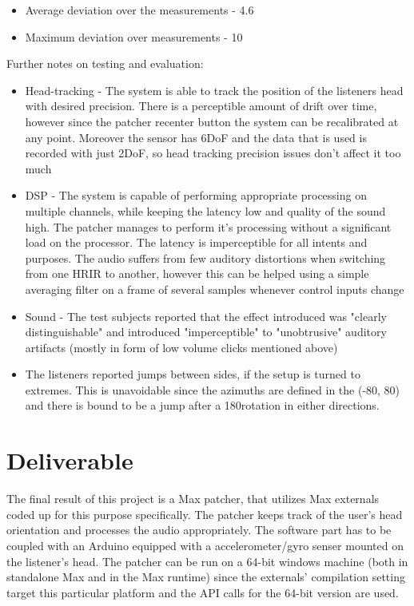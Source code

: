 \documentclass[a4paper,12pt,oneside]{article}
\begin{document}
\begin{itemize}
\begin {center}
\begin {itemize}

\item Average deviation over the  measurements - 4.6\degree 
\item Maximum deviation over measurements - 10\degree 
\end{itemize}
\end {center}

\end{itemize}

Further notes on testing and evaluation:
\begin{itemize}
\item Head-tracking - The system is able to track the position of the listeners head with desired precision. There is a perceptible amount of drift over time, however since the patcher recenter button the system can be recalibrated at any point. Moreover the sensor has 6DoF and the data that is used is recorded with just 2DoF, so head tracking precision issues don't affect it too much
\item DSP - The system is capable of performing appropriate processing on multiple channels, while keeping the latency low and quality of the sound high. The patcher manages to perform it's processing without a significant load on the processor. The latency is imperceptible for all intents and purposes. The audio suffers from few auditory distortions when switching from one HRIR to another, however this can be helped using a simple averaging filter on a frame of several samples whenever control inputs change
\item Sound - The test subjects reported that the effect introduced was "clearly distinguishable" and introduced "imperceptible" to "unobtrusive" auditory artifacts (mostly in form of low volume clicks mentioned above)
\item The listeners reported jumps between sides, if the setup is turned to extremes. This is unavoidable since the azimuths are defined in the (-80, 80) and there is bound to be a jump after a 180\degree rotation in either directions.
\end{itemize}

\section{Deliverable}

The final result of this project is a Max patcher, that utilizes Max externals coded up for this purpose specifically. The patcher keeps track of the user's head orientation and processes the audio appropriately. The software part has to be coupled with an Arduino equipped with a accelerometer/gyro senser mounted on the listener's head. The patcher can be run on a 64-bit windows machine (both in standalone Max and in the Max runtime) since the externals' compilation setting target this particular platform and the API calls for the 64-bit version are used.
\end{document}
